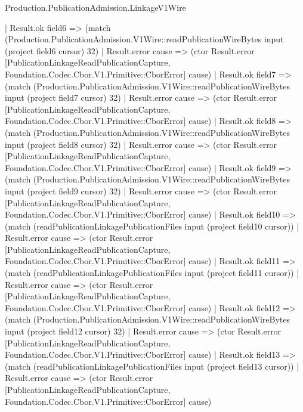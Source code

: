 \begin{lexlean}{Production.PublicationAdmission.LinkageV1Wire}
\begin{semanticmodule}
{                    | Result.ok field6 => (match (Production.PublicationAdmission.V1Wire::readPublicationWireBytes input (project field6 cursor) 32)
                      | Result.error cause => (ctor Result.error [PublicationLinkageReadPublicationCapture, Foundation.Codec.Cbor.V1.Primitive::CborError] cause)
                      | Result.ok field7 => (match (Production.PublicationAdmission.V1Wire::readPublicationWireBytes input (project field7 cursor) 32)
                        | Result.error cause => (ctor Result.error [PublicationLinkageReadPublicationCapture, Foundation.Codec.Cbor.V1.Primitive::CborError] cause)
                        | Result.ok field8 => (match (Production.PublicationAdmission.V1Wire::readPublicationWireBytes input (project field8 cursor) 32)
                          | Result.error cause => (ctor Result.error [PublicationLinkageReadPublicationCapture, Foundation.Codec.Cbor.V1.Primitive::CborError] cause)
                          | Result.ok field9 => (match (Production.PublicationAdmission.V1Wire::readPublicationWireBytes input (project field9 cursor) 32)
                            | Result.error cause => (ctor Result.error [PublicationLinkageReadPublicationCapture, Foundation.Codec.Cbor.V1.Primitive::CborError] cause)
                            | Result.ok field10 => (match (readPublicationLinkagePublicationFiles input (project field10 cursor))
                              | Result.error cause => (ctor Result.error [PublicationLinkageReadPublicationCapture, Foundation.Codec.Cbor.V1.Primitive::CborError] cause)
                              | Result.ok field11 => (match (readPublicationLinkagePublicationFiles input (project field11 cursor))
                                | Result.error cause => (ctor Result.error [PublicationLinkageReadPublicationCapture, Foundation.Codec.Cbor.V1.Primitive::CborError] cause)
                                | Result.ok field12 => (match (Production.PublicationAdmission.V1Wire::readPublicationWireBytes input (project field12 cursor) 32)
                                  | Result.error cause => (ctor Result.error [PublicationLinkageReadPublicationCapture, Foundation.Codec.Cbor.V1.Primitive::CborError] cause)
                                  | Result.ok field13 => (match (readPublicationLinkagePublicationFiles input (project field13 cursor))
                                    | Result.error cause => (ctor Result.error [PublicationLinkageReadPublicationCapture, Foundation.Codec.Cbor.V1.Primitive::CborError] cause)
}
\end{semanticmodule}
\end{lexlean}
